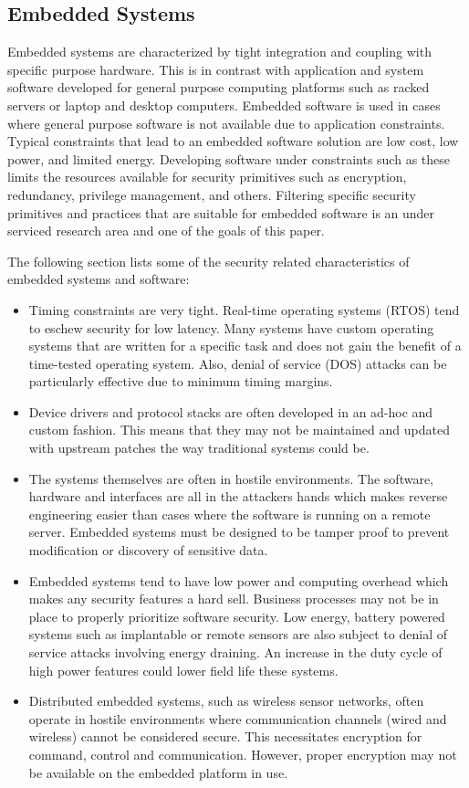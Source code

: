 \documentclass[final,conference,10pt]{IEEEtran}
\begin{document}
\subsection{Embedded Systems}

Embedded systems are characterized by tight integration and coupling with specific purpose hardware.  This is in contrast with application and system software developed for general purpose computing platforms such as racked servers or laptop and desktop computers.  Embedded software is used in cases where general purpose software is not available due to application constraints.  Typical constraints that lead to an embedded software solution are low cost, low power, and limited energy. Developing software under constraints such as these limits the resources available for security primitives such as encryption, redundancy, privilege management, and others.  Filtering specific security primitives and practices that are suitable for embedded software is an under serviced research area and one of the goals of this paper.

The following section lists some of the security related characteristics of embedded systems and software:

\begin{itemize}
\item 
Timing constraints are very tight.  Real-time operating systems (RTOS) tend to eschew security for low latency.  Many systems have custom operating systems that are written for a specific task and does not gain the benefit of a time-tested operating system.  Also, denial of service (DOS) attacks can be particularly effective due to minimum timing margins. \cite{Catal2011}
\item
Device drivers and protocol stacks are often developed in an ad-hoc and custom fashion.  This means that they may not be maintained and updated with upstream patches the way traditional systems could be.
\item 
The systems themselves are often in hostile environments. The software, hardware and interfaces are all in the attackers hands which makes reverse engineering easier than cases where the software is running on a remote server.  Embedded systems must be designed to be tamper proof to prevent modification or discovery of sensitive data.
\item 
Embedded systems tend to have low power and computing overhead which makes any security features a hard sell. Business processes may not be in place to properly prioritize software security.
Low energy, battery powered systems such as implantable or remote sensors are also subject to denial of service attacks involving energy draining.  An increase in the duty cycle of high power features could lower field life these systems. \cite{Vasserman2013}
\item 
Distributed embedded systems, such as wireless sensor networks, often operate in hostile environments where communication channels (wired and wireless) cannot be considered secure.  This necessitates encryption for command, control and communication. However, proper encryption may not be available on the embedded platform in use. \cite{Bojinov2010}
\end{itemize}
\end{document}
